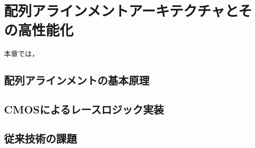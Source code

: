 \chapter{配列アラインメントアーキテクチャとその高性能化}
本章では，
\section{配列アラインメントの基本原理}
\section{CMOSによるレースロジック実装}
\section{従来技術の課題}
